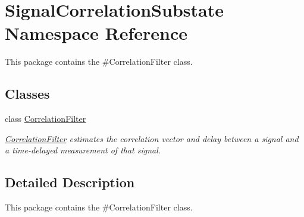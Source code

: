 \hypertarget{namespaceSignalCorrelationSubstate}{}\section{Signal\+Correlation\+Substate Namespace Reference}
\label{namespaceSignalCorrelationSubstate}


This package contains the \#\+Correlation\+Filter class.  


\subsection*{Classes}
\begin{DoxyCompactItemize}
\item 
class \hyperlink{classSignalCorrelationSubstate_1_1CorrelationFilter}{Correlation\+Filter}
\begin{DoxyCompactList}\small\item\em \hyperlink{classSignalCorrelationSubstate_1_1CorrelationFilter}{Correlation\+Filter} estimates the correlation vector and delay between a signal and a time-\/delayed measurement of that signal. \end{DoxyCompactList}\end{DoxyCompactItemize}


\subsection{Detailed Description}
This package contains the \#\+Correlation\+Filter class. 